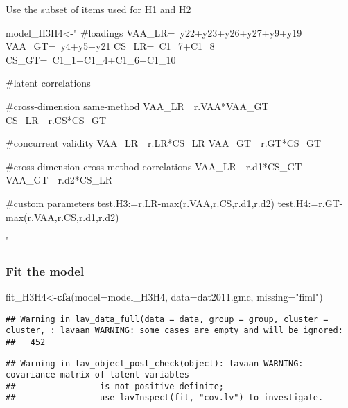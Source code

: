 \documentclass[
]{article}
\newenvironment{Shaded}{\begin{snugshade}}{\end{snugshade}}
\newcommand{\DataTypeTok}[1]{\textcolor[rgb]{0.13,0.29,0.53}{#1}}
\newcommand{\KeywordTok}[1]{\textcolor[rgb]{0.13,0.29,0.53}{\textbf{#1}}}
\newcommand{\NormalTok}[1]{#1}
\newcommand{\StringTok}[1]{\textcolor[rgb]{0.31,0.60,0.02}{#1}}
\begin{document}
Use the subset of items used for H1 and H2

\begin{Shaded}
\begin{Highlighting}[]
\NormalTok{model_H3H4<-}\StringTok{"}
\StringTok{#loadings}
\StringTok{VAA_LR=~y22+y23+y26+y27+y9+y19}
\StringTok{VAA_GT=~y4+y5+y21}
\StringTok{CS_LR=~C1_7+C1_8}
\StringTok{CS_GT=~C1_1+C1_4+C1_6+C1_10}

\StringTok{#latent correlations}

\StringTok{#cross-dimension same-method}
\StringTok{VAA_LR~~r.VAA*VAA_GT}
\StringTok{CS_LR~~r.CS*CS_GT}

\StringTok{#concurrent validity}
\StringTok{VAA_LR~~r.LR*CS_LR}
\StringTok{VAA_GT~~r.GT*CS_GT}

\StringTok{#cross-dimension cross-method correlations}
\StringTok{VAA_LR~~r.d1*CS_GT}
\StringTok{VAA_GT~~r.d2*CS_LR}

\StringTok{#custom parameters}
\StringTok{test.H3:=r.LR-max(r.VAA,r.CS,r.d1,r.d2)}
\StringTok{test.H4:=r.GT-max(r.VAA,r.CS,r.d1,r.d2)}

\StringTok{"}
\end{Highlighting}
\end{Shaded}

\hypertarget{fit-the-model-1}{%
\subsubsection{Fit the model}\label{fit-the-model-1}}

\begin{Shaded}
\begin{Highlighting}[]
\NormalTok{fit_H3H4<-}\KeywordTok{cfa}\NormalTok{(}\DataTypeTok{model=}\NormalTok{model_H3H4,}
              \DataTypeTok{data=}\NormalTok{dat2011.gmc,}
              \DataTypeTok{missing=}\StringTok{"fiml"}\NormalTok{)}
\end{Highlighting}
\end{Shaded}

\begin{verbatim}
## Warning in lav_data_full(data = data, group = group, cluster = cluster, : lavaan WARNING: some cases are empty and will be ignored:
##   452
\end{verbatim}

\begin{verbatim}
## Warning in lav_object_post_check(object): lavaan WARNING: covariance matrix of latent variables
##                 is not positive definite;
##                 use lavInspect(fit, "cov.lv") to investigate.
\end{verbatim}
\end{document}
